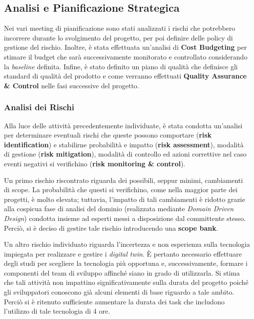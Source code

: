\subsection{Analisi e Pianificazione Strategica}

Nei vari meeting di pianificazione sono stati analizzati i rischi che potrebbero incorrere durante lo svolgimento del progetto, per poi definire delle policy di gestione del rischio. Inoltre, è stata effettuata un'analisi di \textbf{Cost Budgeting} per stimare il budget che sarà successivamente monitorato e controllato considerando la \textit{baseline} definita. Infine, è stato definito un piano di qualità che definisce gli standard di qualità del prodotto e come verranno effettuati \textbf{Quality Assurance \& Control} nelle fasi successive del progetto.

\subsubsection{Analisi dei Rischi}\label{sec:analisi-dei-rischi}
Alla luce delle attività precedentemente individuate, è stata condotta un'analisi per determinare eventuali rischi che queste possono comportare (\textbf{risk identification}) e stabilirne probabilità e impatto (\textbf{risk assessment}), modalità di gestione (\textbf{risk mitigation}), modalità di controllo ed azioni correttive nel caso eventi negativi si verifichino (\textbf{risk monitoring \& control}).

Un primo rischio riscontrato riguarda dei possibili, seppur minimi, cambiamenti di scope.
La probabilità che questi si verifichino, come nella maggior parte dei progetti, è molto elevata; tuttavia, l'impatto di tali cambiamenti è ridotto grazie alla cospicua fase di analisi del dominio (realizzata mediante \textit{Domain Driven Design}) condotta insieme ad esperti messi a disposizione dal committente stesso.
Perciò, si è deciso di gestire tale rischio introducendo una \textbf{scope bank}.

Un altro rischio individuato riguarda l'incertezza e non esperienza sulla tecnologia impiegata per realizzare e gestire i \textit{digital twin}.
È pertanto necessario effettuare degli studi per scegliere la tecnologia più opportuna e, successivamente, formare i componenti del team di sviluppo affinché siano in grado di utilizzarla.
Si stima che tali attività non impattino significativamente sulla durata del progetto poiché gli sviluppatori conoscono già alcuni elementi di base riguardo a tale ambito.
Perciò si è ritenuto sufficiente aumentare la durata dei task che includono l'utilizzo di tale tecnologia di 4 ore.

